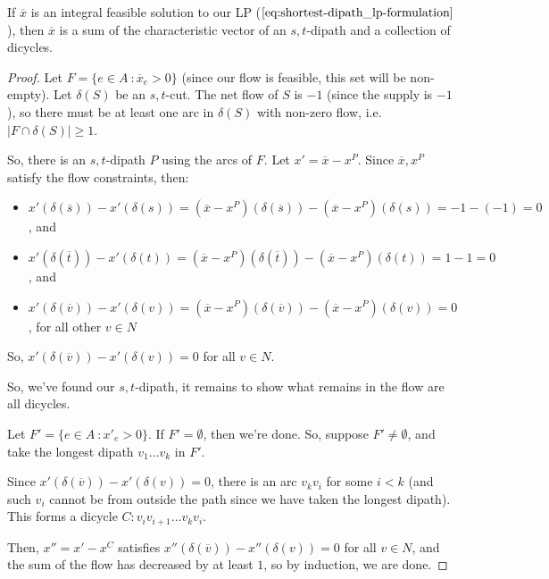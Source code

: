 \begin{theorem}{}{}
    If $\overline{x}$ is an integral feasible solution to our LP ($\Cref{eq:shortest-dipath_lp-formulation}$), then $\overline{x}$ is a sum of the characteristic vector of an $s,t$-dipath and a collection of dicycles.
\end{theorem}
\begin{proof}
    Let $F = \{e \in A\::\overline{x}_e > 0\}$ (since our flow is feasible, this set will be non-empty).
    Let $\delta(S)$ be an $s,t$-cut.
    The net flow of $S$ is $-1$ (since the supply is $-1$), so there must be at least one arc in $\delta(S)$ with non-zero flow, i.e. $|F \cap \delta(S)| \geq 1$.

    So, there is an $s,t$-dipath $P$ using the arcs of $F$. 
    Let $x' = \overline{x} - x^P$. 
    Since $\overline{x}, x^P$ satisfy the flow constraints, then:
    \begin{itemize}
        \item $x'(\delta(\overline{s})) - x'(\delta(s)) = (\overline{x} - x^P)(\delta(\overline{s})) - (\overline{x} - x^P)(\delta(s)) = -1 - (-1) = 0$, and
        \item $x'(\delta(\overline{t})) - x'(\delta(t)) = (\overline{x} - x^P)(\delta(\overline{t})) - (\overline{x} - x^P)(\delta(t)) = 1 - 1 = 0$, and
        \item $x'(\delta(\overline{v})) - x'(\delta(v)) = (\overline{x} - x^P)(\delta(\overline{v})) - (\overline{x} - x^P)(\delta(v)) = 0$, for all other $v \in N$ 
    \end{itemize} 
    So, $x'(\delta(\overline{v})) - x'(\delta(v)) = 0$ for all $v \in N$.
    
    So, we've found our $s,t$-dipath, it remains to show what remains in the flow are all dicycles.

    Let $F' = \{e \in A\::x'_e > 0\}$.
    If $F' = \emptyset$, then we're done.
    So, suppose $F' \neq \emptyset$, and take the longest dipath $v_1\ldots v_k$ in $F'$.

    Since $x'(\delta(\overline{v})) - x'(\delta(v)) = 0$, there is an arc $v_kv_i$ for some $i < k$ (and such $v_i$ cannot be from outside the path since we have taken the longest dipath). This forms a dicycle $C: v_iv_{i+1}\ldots v_kv_i$.

    Then, $x'' = x' - x^C$ satisfies $x''(\delta(\overline{v})) - x''(\delta(v)) = 0$ for all $v \in N$, and the sum of the flow has decreased by at least $1$, so by induction, we are done.
\end{proof} 

